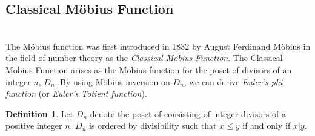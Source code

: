 \documentclass[psamsfonts]{amsart}
\theoremstyle{definition}
\newtheorem{defn}[thm]{Definition}
\theoremstyle{remark}
\numberwithin{equation}{section}
\begin{document}
\subsection{Classical M\"{o}bius Function} \hfill\\
\indent The M\"{o}bius function was first introduced in 1832 by August Ferdinand M\"{o}bius in the field of number theory as the \textit{Classical M\"{o}bius Function}. The Classical M\"{o}bius Function arises as the M\"{o}bius function for the poset of divisors of an integer $n$, $D_n$. By using M\"{o}bius inversion on $D_n$, we can derive \textit{Euler's phi function} (or \textit{Euler's Totient function}).

\begin{defn}
Let $D_n$ denote the poset of consisting of integer divisors of a positive integer $n$. $D_n$ is ordered by divisibility such that $x\leq y$ if and only if $x\vert y$.
\end{defn}
\end{document}
